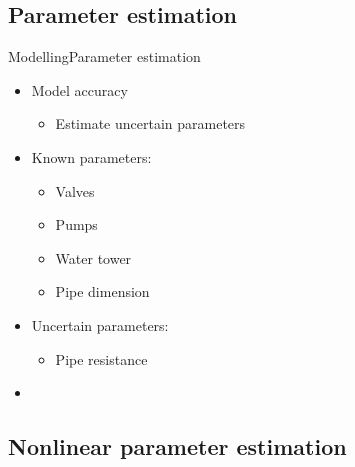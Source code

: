 

\subsection{Parameter estimation}

\begin{frame}{Modelling}{Parameter estimation}
\begin{itemize}
	\item<1-> Model accuracy
	\begin{itemize} 
		\item<1-> Estimate uncertain parameters 
	\end{itemize}	 
\end{itemize}

\begin{itemize}
	\item<2-> Known parameters:
	\begin{itemize}
		\item<2-> Valves
		\item<2-> Pumps 
		\item<2-> Water tower
		\item<2-> Pipe dimension
	\end{itemize}	
\end{itemize}

\begin{itemize}
\item<3-> Uncertain parameters:
	\begin{itemize}
		\item<3-> Pipe resistance
	\end{itemize}
\end{itemize}

\begin{itemize}
\item<4->[]	
\begin{figure}[H]
	\centering
	 
\end{figure}\vspace{-0.5cm}		
\end{itemize}	
\end{frame}



\subsection{Nonlinear parameter estimation}

